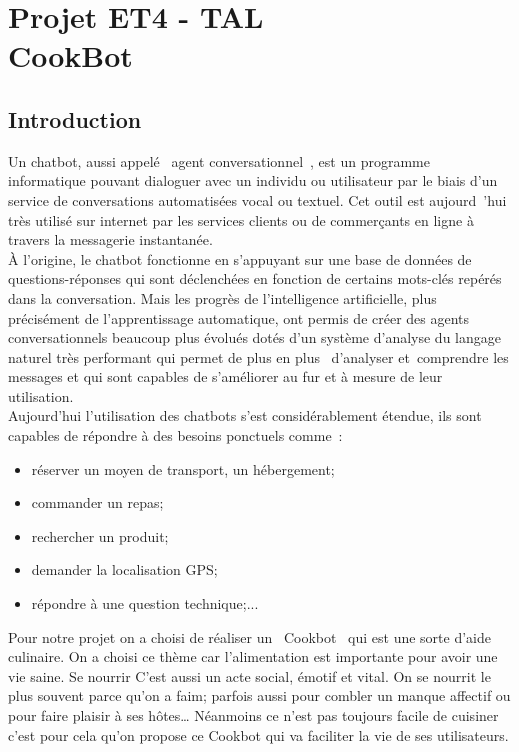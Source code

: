 \documentclass{report}
\title{}\let\mytitle\thetitle
\author{Karim \textsc{Balde}\\Yasmine \textsc{Kertous}\\Thibault \textsc{Lasou}}
\date\today
\begin{document}
\pagestyle{polytech}
\chapter*{Projet ET4 - TAL\\CookBot}
\tableofcontents
\section*{Introduction}

Un chatbot, aussi appelé \og agent conversationnel \fg{}, est un programme informatique pouvant dialoguer avec un individu ou utilisateur par le biais d'un service de conversations automatisées vocal ou textuel. Cet outil est aujourd 'hui très utilisé sur internet par les services clients ou de commerçants en ligne à travers la messagerie instantanée.\\

À l'origine, le chatbot fonctionne en s'appuyant sur une base de données de questions-réponses qui sont déclenchées en fonction de certains mots-clés repérés dans la conversation. Mais les progrès de l'intelligence artificielle, plus précisément de l'apprentissage automatique, ont permis de créer des agents conversationnels beaucoup plus évolués dotés d'un système d'analyse du langage naturel très performant qui  permet de plus en plus  d'analyser et comprendre les messages et qui sont capables de s'améliorer au fur et à mesure de leur utilisation.\\


Aujourd'hui l'utilisation des chatbots s'est considérablement étendue, ils sont capables de répondre à des besoins ponctuels comme :
\begin{itemize}
\item réserver un moyen de transport, un hébergement;
\item commander un repas;
\item rechercher un produit;
\item demander la localisation GPS;
\item répondre à une question technique;...
\end{itemize}
Pour notre projet on a choisi de réaliser un \og Cookbot \fg{} qui est une sorte d'aide culinaire. On a choisi ce thème car l’alimentation est importante pour avoir une vie saine. Se nourrir C'est aussi un acte social, émotif et vital. On se nourrit le plus souvent parce qu'on a faim; parfois aussi pour combler un manque affectif ou pour faire plaisir à ses hôtes… Néanmoins ce n'est pas toujours facile de cuisiner c'est pour cela qu'on propose ce Cookbot qui va faciliter la vie de ses utilisateurs.\\
\end{document}
